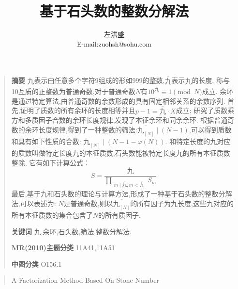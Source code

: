 \documentclass[a4paper]{article}
\title{基于石头数的整数分解法}
\author{\small  左洪盛\\ \small E-mail:zuohsh@sohu.com}
\date{}
\numberwithin{equation}{section}
\begin{document}
\maketitle
\begin{quote}
\textbf{摘要} $九$表示由任意多个字符9组成的形如999的整数,$\overline{九}$表示$九$的长度,
称与10互质的正整数为普通奇数,对于普通奇数$N$有$10^{\overline{九}} \equiv 1 \pmod{N}$成立.
余环是通过特定算法,由普通奇数的余数形成的具有固定相邻关系的余数序列.
首先,证明了质数的所有余环的长度相等并且$p-1=\overline{九} \cdot X $成立;
研究了质数乘方和多质因子合数的余环长度规律,发现了本征余环和同余余环.
根据普通奇数的余环长度规律,得到了一种整数的筛法:$\overline{九_{[N]}} \mid (N-1)$,可以得到质数和具有如下性质的合数:
$\overline{九_{[N]}} \mid (N-1-\varphi(N))$.
和特定长度的九对应的质数叫做特定长度九的本征质数,石头数能被特定长度$九$的所有本征质数整除,
它有如下计算公式：
\begin{displaymath}S=\frac{\displaystyle 九}
			{\displaystyle
			\prod_{\substack{m \mid \overline{九} ,m < \overline{九} }}S_{m}
			}
\end {displaymath}
最后,基于$\overline{九}$和石头数的理论与计算方法,形成了一种基于石头数的整数分解法,可以表述为:
$N$是普通奇数,则以$\overline{九_{[N]}}$的所有因子为九长度,这些$九$对应的所有本征质数的集合包含了$N$的所有质因子.


\textbf{关键词} 九,余环,石头数,筛法,整数分解法.

\textbf{MR(2010)主题分类} 11A41,11A51

\textbf{中图分类} O156.1
\end{quote}
\begin{quote}
\begin{center}
\Large A Factorization Method  Based On Stone Number
\end{center}
\end{quote}
\end{document}
